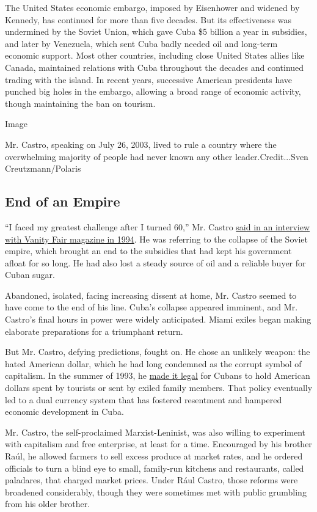 The United States economic embargo, imposed by Eisenhower and widened by
Kennedy, has continued for more than five decades. But its effectiveness
was undermined by the Soviet Union, which gave Cuba \$5 billion a year
in subsidies, and later by Venezuela, which sent Cuba badly needed oil
and long-term economic support. Most other countries, including close
United States allies like Canada, maintained relations with Cuba
throughout the decades and continued trading with the island. In recent
years, successive American presidents have punched big holes in the
embargo, allowing a broad range of economic activity, though maintaining
the ban on tourism.

Image

Mr. Castro, speaking on July 26, 2003, lived to rule a country where the
overwhelming majority of people had never known any other
leader.Credit...Sven Creutzmann/Polaris

\hypertarget{end-of-an-empire}{%
\subsection{End of an Empire}\label{end-of-an-empire}}

``I faced my greatest challenge after I turned 60,'' Mr. Castro
\href{http://www.vanityfair.com/news/1994/03/fidel-castro-exclusive-interview}{said
in an interview with Vanity Fair magazine in 1994}. He was referring to
the collapse of the Soviet empire, which brought an end to the subsidies
that had kept his government afloat for so long. He had also lost a
steady source of oil and a reliable buyer for Cuban sugar.

Abandoned, isolated, facing increasing dissent at home, Mr. Castro
seemed to have come to the end of his line. Cuba's collapse appeared
imminent, and Mr. Castro's final hours in power were widely anticipated.
Miami exiles began making elaborate preparations for a triumphant
return.

But Mr. Castro, defying predictions, fought on. He chose an unlikely
weapon: the hated American dollar, which he had long condemned as the
corrupt symbol of capitalism. In the summer of 1993, he
\href{http://www.nytimes3xbfgragh.onion/1993/08/16/business/cuba-s-new-money-law.html}{made
it legal} for Cubans to hold American dollars spent by tourists or sent
by exiled family members. That policy eventually led to a dual currency
system that has fostered resentment and hampered economic development in
Cuba.

Mr. Castro, the self-proclaimed Marxist-Leninist, was also willing to
experiment with capitalism and free enterprise, at least for a time.
Encouraged by his brother Raúl, he allowed farmers to sell excess
produce at market rates, and he ordered officials to turn a blind eye to
small, family-run kitchens and restaurants, called paladares, that
charged market prices. Under Rául Castro, those reforms were broadened
considerably, though they were sometimes met with public grumbling from
his older brother.

